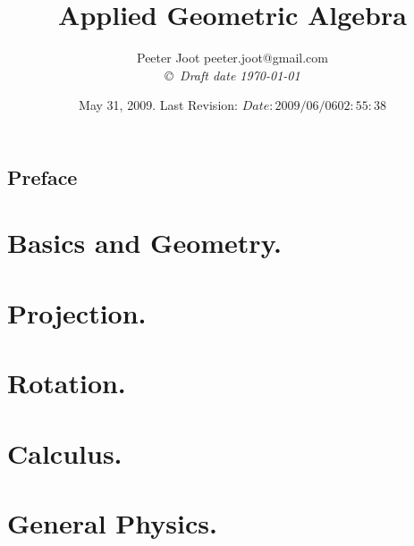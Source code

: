 \documentclass[12pt,leqno]{book}
\title{Applied Geometric Algebra}
\author{Peeter Joot  \quad peeter.joot@gmail.com \\
{\small\em \copyright \  Draft date \today }}
\date{ May 31, 2009.  Last Revision: $Date: 2009/06/06 02:55:38 $ }
\begin{document}
\maketitle
\tableofcontents
\listoffigures
\listoftables
\chapter*{Preface}\normalsize
\pagestyle{plain}


\pagestyle{headings}


\part{Basics and Geometry.}


















\part{Projection.}






\part{Rotation.}





\part{Calculus.}






\part{General Physics.}









\end{document}
